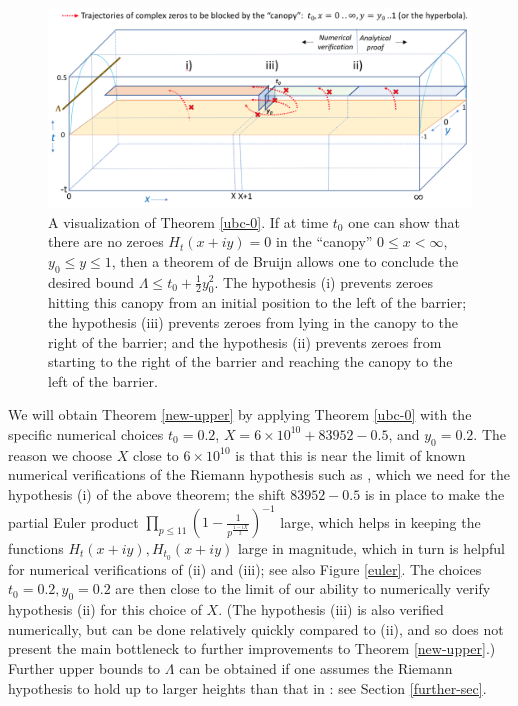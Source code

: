 \begin{figure}[h!]
  \includegraphics[width=0.9\linewidth]{Barrier_approach.png}
  \caption{A visualization of Theorem \ref{ubc-0}.  If at time $t_0$ one can show that there are no zeroes $H_t(x+iy)=0$ in the ``canopy'' $0 \leq x <\infty$, $y_0 \leq y \leq 1$, then a theorem of de Bruijn allows one to conclude the desired bound $\Lambda \leq t_0 + \frac{1}{2} y_0^2$.  The hypothesis (i) prevents zeroes hitting this canopy from an initial position to the left of the barrier; the hypothesis (iii) prevents zeroes from lying in the canopy to the right of the barrier; and the hypothesis (ii) prevents zeroes from starting to the right of the barrier and reaching the canopy to the left of the barrier.}
\label{barrier-fig}
\end{figure}

We will obtain Theorem \ref{new-upper} by applying Theorem \ref{ubc-0} with the specific numerical choices $t_0 = 0.2$, $X = 6 \times 10^{10} + 83952 - 0.5$, and $y_0 = 0.2$.  The reason we choose $X$ close to $6 \times 10^{10}$ is that this is near the limit of known numerical verifications of the Riemann hypothesis such as \cite{platt}, which we need for the hypothesis (i) of the above theorem; the shift $83952 - 0.5$ is in place to make the partial Euler product $\prod_{p \leq 11} \left(1 - \frac{1}{p^{\frac{1-iX}{2}}}\right)^{-1}$ large, which helps in keeping the functions $H_t(x+iy), H_{t_0}(x+iy)$ large in magnitude, which in turn is helpful for numerical verifications of (ii) and (iii); see also Figure \ref{euler}.  The choices $t_0=0.2, y_0=0.2$ are then close to the limit of our ability to numerically verify hypothesis (ii) for this choice of $X$.  (The hypothesis (iii) is also verified numerically, but can be done relatively quickly compared to (ii), and so does not present the main bottleneck to further improvements to Theorem \ref{new-upper}.)  Further upper bounds to $\Lambda$ can be obtained if one assumes the Riemann hypothesis to hold up to larger heights than that in \cite{platt}: see Section \ref{further-sec}.

